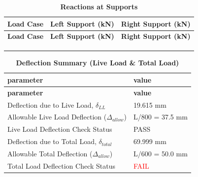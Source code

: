 \documentclass[12pt,a4paper]{report}
\numberwithin{table}{chapter}
\numberwithin{figure}{chapter}
\begin{document}
\vspace{1em}
\begin{longtable}{|>{\centering\arraybackslash}p{5.2cm}|>{\centering\arraybackslash}p{5.2cm}|>{\centering\arraybackslash}p{5.2cm}|}
\caption{\textbf{Reactions at Supports}}
\hline
\textbf{Load Case} & \textbf{Left Support (kN)} & \textbf{Right Support (kN)} \\[6pt]
\hline
\endfirsthead

\hline

\textbf{Load Case} & \textbf{Left Support (kN)} & \textbf{Right Support (kN)} \\[6pt]

\hline

\endhead
 &  &  \\[6pt]
\hline
 &  &  \\[6pt]
\hline
 &  &  \\[6pt]
\hline
\end{longtable}

\vspace{1em}
\begin{longtable}{|L{7cm}|p{8.5cm}|}
\caption{\textbf{Deflection Summary (Live Load \& Total Load)}}
\hline
\textbf{parameter} & \textbf{value} \\
\hline
\endfirsthead

\hline

\textbf{parameter} & \textbf{value} \\

\hline

\endhead
\textnormal{Deflection due to Live Load, $\delta_{LL}$} & 19.615 mm \\[6pt]
\hline
\textnormal{Allowable Live Load Deflection ($\Delta_{allow}$)} & L/800 = 37.5 mm \\[6pt]
\hline
\textnormal{Live Load Deflection Check Status} & PASS \\[6pt]
\hline
\textnormal{Deflection due to Total Load, $\delta_{total}$} & 69.999 mm \\[6pt]
\hline
\textnormal{Allowable Total Deflection ($\Delta_{allow}$)} & L/600 = 50.0 mm \\[6pt]
\hline
\textnormal{Total Load Deflection Check Status} & \textcolor{red}{FAIL} \\[6pt]
\hline
\end{longtable}
\end{document}
